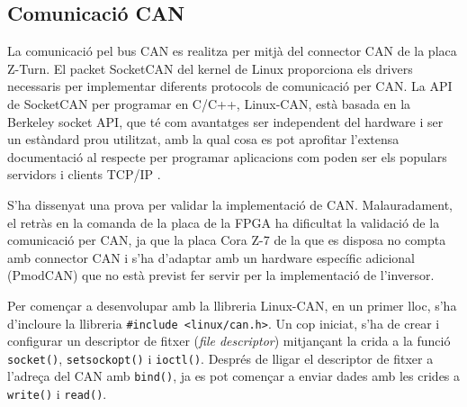 \subsection{ Comunicació CAN }
{ 
    La comunicació pel bus CAN es realitza per mitjà del connector CAN de la
    placa Z-Turn. El packet SocketCAN del kernel de Linux proporciona els
    drivers necessaris per implementar diferents protocols de comunicació per
    CAN. La \ac{API} de SocketCAN per programar en C/C++, Linux-CAN, està basada en la Berkeley socket API, que
    té com avantatges ser independent del hardware i ser un estàndard prou
    utilitzat, amb la qual cosa es pot aprofitar l'extensa documentació al
    respecte per programar aplicacions com poden ser els populars servidors i
    clients TCP/IP \cite{can-utils} \cite{socketCAN}.

    S'ha dissenyat una prova per validar la implementació de CAN.
    Malauradament, el retràs en la comanda de la placa de la FPGA ha dificultat
    la validació de la comunicació per CAN, ja que la placa Cora Z-7 de la que
    es disposa no compta amb connector CAN i s'ha d'adaptar amb un hardware
    específic adicional (PmodCAN) que no està previst fer servir per la
    implementació de l'inversor.

    Per començar a desenvolupar amb la llibreria Linux-CAN, en un primer lloc,
    s'ha d'incloure la llibreria \lstinline{#include <linux/can.h>}. Un cop
    iniciat, s'ha de crear i configurar un descriptor de fitxer (\emph{file
    descriptor}) mitjançant la crida a la funció \lstinline{socket()},
    \lstinline{setsockopt()} i \lstinline{ioctl()}. Després de lligar el
    descriptor de fitxer a l'adreça del CAN amb \lstinline{bind()}, ja es pot
    començar a enviar dades amb les crides a \lstinline{write()} i
    \lstinline{read()}.
}